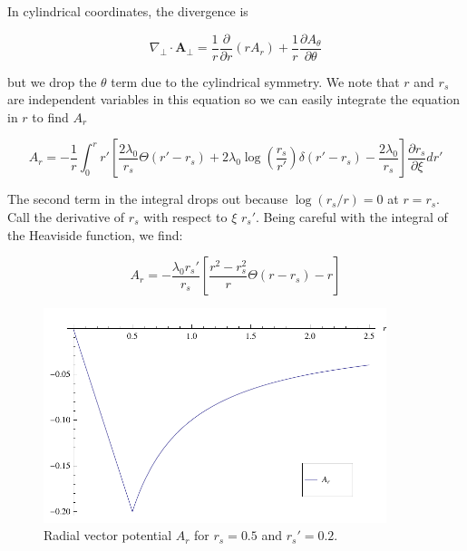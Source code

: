 \documentclass[aps,prl,preprint,groupedaddress]{revtex4-1}
\begin{document}

In cylindrical coordinates, the divergence is

\begin{equation}\label{eq:a_perp_cyl}
\nabla_\perp \cdot \mathbf{A}_\perp = \frac{1}{r}\frac{\partial}{\partial r} (r A_r) + \frac{1}{r}\frac{\partial A_{\theta}}{\partial \theta}
\end{equation}

but we drop the $\theta$ term due to the cylindrical symmetry. We note that $r$ and $r_s$ are independent variables in this equation so we can easily integrate the equation in $r$ to find $A_r$

\begin{equation}\label{eq:a_r_int}
A_r = -\frac{1}{r}\int_0^rr'\left[\frac{2\lambda_0}{r_s}\Theta(r'-r_s) + 2\lambda_0 \log\left(\frac{r_s}{r'}\right)\delta(r'-r_s) - \frac{2\lambda_0}{r_s}\right]\frac{\partial r_s}{\partial \xi}dr'
\end{equation}

The second term in the integral drops out because $\log(r_s/r) = 0$ at $r = r_s$. Call the derivative of $r_s$ with respect to $\xi$ $r_s'$. Being careful with the integral of the Heaviside function, we find:

\begin{equation}\label{eq:a_r}
A_r = -\frac{\lambda_0 r_s'}{r_s}\left[\frac{r^2 -r_s^2}{r}\Theta(r-r_s) -r\right]
\end{equation}

\begin{figure}[htb]\label{fig:a_r_graph}
  \centering
    \includegraphics[width=100mm]{./figures/A_r.pdf}
      \caption{Radial vector potential $A_r$ for $r_s = 0.5$ and $r_s' = 0.2$.}
\end{figure}
\end{document}
